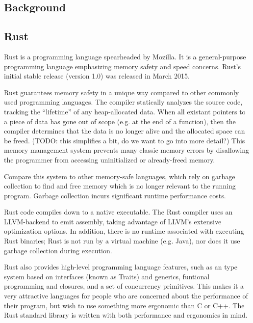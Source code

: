 \documentclass{article}
\begin{document}
\begin{multicols}{2}

\section{Background}

\subsection{Rust}

Rust is a programming language spearheaded by Mozilla. It is a
general-purpose programming language emphasizing memory safety and speed
concerns. Rust's initial stable release (version 1.0) was released in March
2015. \newline

Rust guarantees memory safety in a unique way compared to other commonly used
programming languages. The compiler statically analyzes the source code,
tracking the ``lifetime'' of any heap-allocated data. When all existant pointers
to a piece of data has gone out of scope (e.g. at the end of a function), then
the compiler determines that the data is no longer alive and the allocated space
can be freed. (TODO: this simplifies a bit, do we want to go into more detail?)
This memory management system prevents many classic memory errors by disallowing
the programmer from accessing uninitialized or already-freed memory. \newline

Compare this system to other memory-safe languages, which rely on garbage
collection to find and free memory which is no longer relevant to the running
program. Garbage collection incurs significant runtime performance costs.
\newline

Rust code compiles down to a native executable. The Rust compiler uses an
LLVM-backend to emit assembly, taking advantage of LLVM's extensive optimization
options. In addition, there is no runtime associated with executing Rust
binaries; Rust is not run by a virtual machine (e.g. Java), nor does it use
garbage collection during execution. \newline

Rust also provides high-level programming language features, such as an type
system based on interfaces (known as Traits) and generics, funtional programming
and closures, and a set of concurrency primitives. This makes it a very
attractive languages for people who are concerned about the performance of their
program, but wish to use something more ergonomic than C or C++. The Rust
standard library is written with both performance and ergonomics in mind.


\end{multicols}
\end{document}
